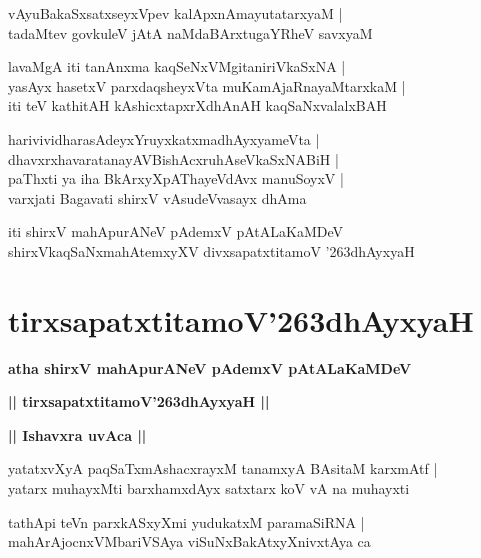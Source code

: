\documentclass[twoside,12pt,openright]{book}
\def\S{\char'263}
\newcounter{shloka}[chapter]
\def\uvaca#1{\centerline{{\large\textbf{#1}}}}
\begin{document}
\begin{shloka}%
vAyuBakaSxsatxseyxVpev kalApxnAmayutatarxyaM |\\
tadaMtev govkuleV jAtA naMdaBArxtugaYRheV savxyaM 
\end{shloka}

\begin{shloka}%
lavaMgA iti tanAnxma kaqSeNxVMgitaniriVkaSxNA |\\
yasAyx hasetxV parxdaqsheyxVta muKamAjaRnayaMtarxkaM |\\
iti teV kathitAH kAshicxtapxrXdhAnAH kaqSaNxvalalxBAH 
\end{shloka}

\begin{shloka}%
harivividharasAdeyxYruyxkatxmadhAyxyameVta |\\
dhavxrxhavaratanayAVBishAcxruhAseVkaSxNABiH |\\
paThxti ya iha BkArxyXpAThayeVdAvx manuSoyxV |\\
varxjati Bagavati shirxV vAsudeVvasayx dhAma
\end{shloka}

\begin{center}
iti shirxV mahApurANeV pAdemxV pAtALaKaMDeV shirxVkaqSaNxmahAtemxyXV  
divxsapatxtitamoV \S dhAyxyaH
\end{center}

\chapter{tirxsapatxtitamoV\S dhAyxyaH}

\begin{center}
{\LARGE\bfseries atha shirxV mahApurANeV pAdemxV pAtALaKaMDeV }
\end{center}

\begin{center}         
{\LARGE\bfseries || tirxsapatxtitamoV\S dhAyxyaH ||}
\end{center}

\uvaca{|| Ishavxra uvAca ||}

\begin{shloka}%
yatatxvXyA paqSaTxmAshacxrayxM tanamxyA BAsitaM karxmAtf |\\
yatarx muhayxMti barxhamxdAyx satxtarx koV vA na muhayxti 
\end{shloka}

\begin{shloka}%
tathApi teVn parxkASxyXmi yudukatxM paramaSiRNA |\\
mahArAjocnxVMbariVSAya viSuNxBakAtxyXnivxtAya ca 
\end{shloka}
\end{document}
